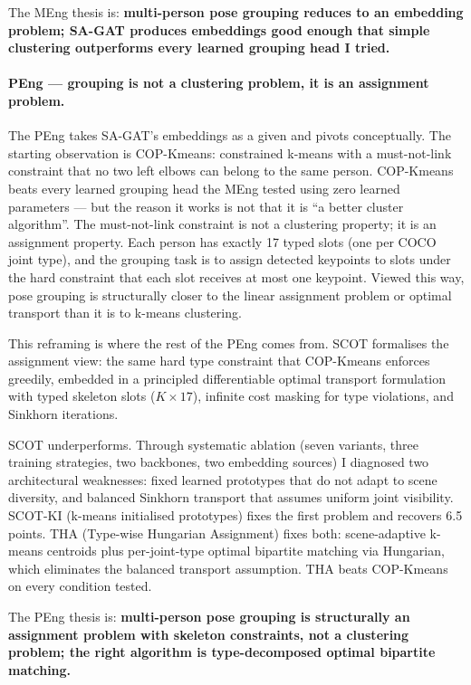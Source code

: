 The MEng thesis is: \textbf{multi-person pose grouping reduces to an embedding problem; SA-GAT produces embeddings good enough that simple clustering outperforms every learned grouping head I tried.}

\paragraph{PEng --- grouping is not a clustering problem, it is an assignment problem.}

The PEng takes SA-GAT's embeddings as a given and pivots conceptually. The starting observation is COP-Kmeans: constrained k-means with a must-not-link constraint that no two left elbows can belong to the same person. COP-Kmeans beats every learned grouping head the MEng tested using zero learned parameters --- but the reason it works is not that it is ``a better cluster algorithm''. The must-not-link constraint is not a clustering property; it is an assignment property. Each person has exactly 17 typed slots (one per COCO joint type), and the grouping task is to assign detected keypoints to slots under the hard constraint that each slot receives at most one keypoint. Viewed this way, pose grouping is structurally closer to the linear assignment problem or optimal transport than it is to k-means clustering.

This reframing is where the rest of the PEng comes from. SCOT formalises the assignment view: the same hard type constraint that COP-Kmeans enforces greedily, embedded in a principled differentiable optimal transport formulation with typed skeleton slots ($K \times 17$), infinite cost masking for type violations, and Sinkhorn iterations.

SCOT underperforms. Through systematic ablation (seven variants, three training strategies, two backbones, two embedding sources) I diagnosed two architectural weaknesses: fixed learned prototypes that do not adapt to scene diversity, and balanced Sinkhorn transport that assumes uniform joint visibility. SCOT-KI (k-means initialised prototypes) fixes the first problem and recovers 6.5 points. THA (Type-wise Hungarian Assignment) fixes both: scene-adaptive k-means centroids plus per-joint-type optimal bipartite matching via Hungarian, which eliminates the balanced transport assumption. THA beats COP-Kmeans on every condition tested.

The PEng thesis is: \textbf{multi-person pose grouping is structurally an assignment problem with skeleton constraints, not a clustering problem; the right algorithm is type-decomposed optimal bipartite matching.}

